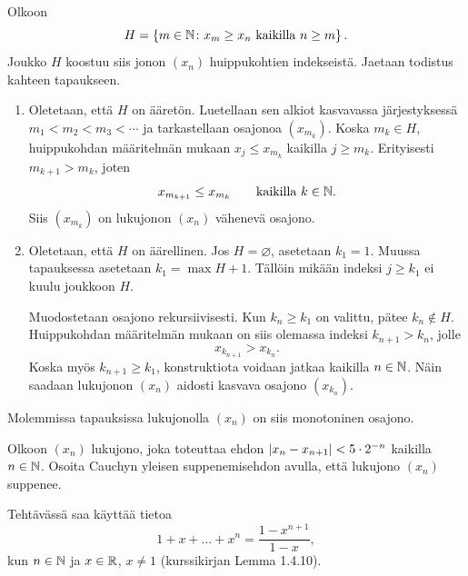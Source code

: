 \documentclass[11pt,a4paper]{amsart}
\begin{document}
\begin{solution}
Olkoon
\[
H = \left\lbrace m \in \mathbb{N} \colon x_m \geq x_n \text{ kaikilla } n \geq m\right\rbrace.
\]
Joukko \(H\) koostuu siis jonon \((x_n)\) huippukohtien indekseistä.
Jaetaan todistus kahteen tapaukseen.
\begin{enumerate}
\item Oletetaan, että \(H\) on ääretön. Luetellaan sen alkiot kasvavassa
järjestyksessä \(m_1 < m_2 < m_3 < \cdots\) ja tarkastellaan osajonoa
\((x_{m_k})\). Koska \(m_k \in H\), huippukohdan määritelmän mukaan
\(x_j \leq x_{m_k}\) kaikilla \(j \geq m_k\). Erityisesti
\(m_{k+1} > m_k\), joten
\[
x_{m_{k+1}} \leq x_{m_k} \qquad \text{kaikilla } k \in \mathbb{N}.
\]
Siis \((x_{m_k})\) on lukujonon \((x_n)\) vähenevä osajono.
\item Oletetaan, että \(H\) on äärellinen. Jos \(H = \varnothing\),
asetetaan \(k_1 = 1\). Muussa tapauksessa asetetaan \(k_1 = \max H + 1\).
Tällöin mikään indeksi \(j \geq k_1\) ei kuulu joukkoon \(H\).

Muodostetaan osajono rekursiivisesti. Kun \(k_n \geq k_1\) on valittu,
pätee \(k_n \notin H\). Huippukohdan määritelmän mukaan on siis olemassa
indeksi \(k_{n+1} > k_n\), jolle
\[
x_{k_{n+1}} > x_{k_n}.
\]
Koska myös \(k_{n+1} \geq k_1\), konstruktiota voidaan jatkaa kaikilla
\(n \in \mathbb{N}\). Näin saadaan lukujonon \((x_n)\) aidosti kasvava
osajono \((x_{k_n})\).
\end{enumerate}
Molemmissa tapauksissa lukujonolla \((x_n)\) on siis monotoninen osajono.
\end{solution}

\begin{exercise}
Olkoon \((x_n)\) lukujono, joka toteuttaa ehdon
\(\lvert x_n - x_{n+1}\rvert < 5 \cdot 2^{-n}\) kaikilla \(n \in \mathbb{N}\).
Osoita Cauchyn yleisen suppenemisehdon avulla, että lukujono \((x_n)\)
suppenee.

Tehtävässä saa käyttää tietoa
\[
1 + x + \ldots + x^n = \frac{1 - x^{n+1}}{1 - x},
\]
kun \(n \in \mathbb{N}\) ja \(x \in \mathbb{R}\), \(x \neq 1\)
(kurssikirjan Lemma 1.4.10).
\end{exercise}
\end{document}
